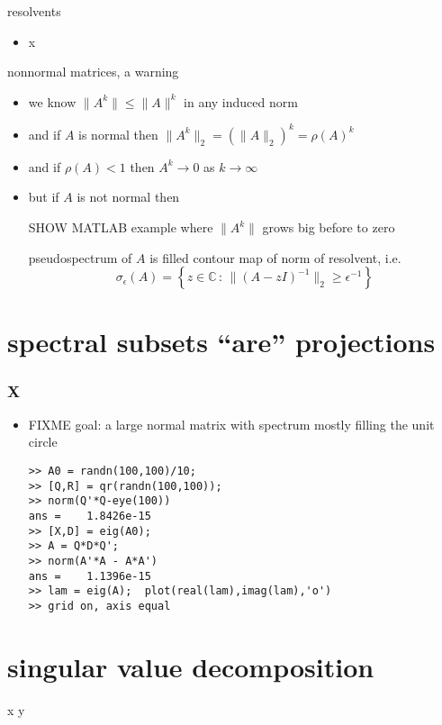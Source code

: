 \documentclass[10pt,hyperref]{beamer}
\newcommand{\CC}{\mathbb{C}}
\newcommand{\eps}{\epsilon}
\begin{document}
\begin{frame}{resolvents}

\begin{itemize}
\item x
\end{itemize}
\end{frame}


\begin{frame}{nonnormal matrices, a warning}

\begin{itemize}
\item we know $\|A^k\|\le \|A\|^k$ in any induced norm
\item and if $A$ is normal then $\|A^k\|_2 = (\|A\|_2)^k = \rho(A)^k$
\item and if $\rho(A)<1$ then $A^k \to 0$ as $k\to \infty$
\item but if $A$ is not normal then

SHOW MATLAB example where $\|A^k\|$ grows big before to zero

pseudospectrum of $A$ is filled contour map of norm of resolvent, i.e.
    $$\sigma_\eps(A) = \left\{z\in\CC\,:\,\|(A-z I)^{-1}\|_2 \ge \eps^{-1}\right\}$$
\end{itemize}
\end{frame}



\section{spectral subsets ``are'' projections}

\begin{frame}[fragile]
\frametitle{X}

\begin{itemize}
\item FIXME  goal: a large normal matrix with spectrum mostly filling the unit circle

\begin{Verbatim}[fontsize=\scriptsize]
>> A0 = randn(100,100)/10;
>> [Q,R] = qr(randn(100,100));
>> norm(Q'*Q-eye(100))
ans =    1.8426e-15
>> [X,D] = eig(A0);
>> A = Q*D*Q';
>> norm(A'*A - A*A')
ans =    1.1396e-15
>> lam = eig(A);  plot(real(lam),imag(lam),'o')
>> grid on, axis equal
\end{Verbatim}

\end{itemize}
\end{frame}


\section{singular value decomposition}

\begin{frame}{x}
y
\end{frame}
\end{document}
